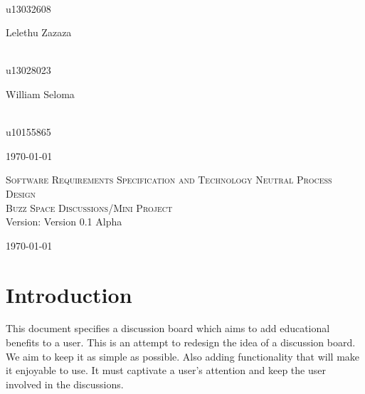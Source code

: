 \documentclass[a4paper,12pt]{report}
\begin{document}
\begin{titlepage}
\begin{center}
\begin{minipage}{0.4\textwidth}
\end{minipage}
\begin{minipage}{0.4\textwidth}
\begin{flushright} \large
\emph{} \\
u13032608
\end{flushright}
\end{minipage}
\begin{minipage}{0.4\textwidth}
\begin{flushleft} \large
Lelethu {Zazaza}
\end{flushleft}
\end{minipage}
\begin{minipage}{0.4\textwidth}
\begin{flushright} \large
\emph{} \\
u13028023
\end{flushright}
\end{minipage}
\begin{minipage}{0.4\textwidth}
\begin{flushleft} \large
William {Seloma}
\end{flushleft}
\end{minipage}
\begin{minipage}{0.4\textwidth}
\begin{flushright} \large
\emph{} \\
u10155865
\end{flushright}
\end{minipage}

\vfill
{\large \today}
\end{center}
\end{titlepage}
\footnotesize

\normalsize

\renewcommand{\thesection}{\arabic{section}}
\newpage
\begin{center}
\textsc{\LARGE Software Requirements Specification and Technology Neutral Process Design}\\[1.5cm]
\textsc{\Large Buzz Space Discussions/Mini Project}\\[0.5cm]
Version: Version 0.1 Alpha 

\today
\end{center}
\tableofcontents{}
\section{Introduction}
This document specifies a discussion board which aims to add educational benefits to a user. This is an attempt to redesign the idea of a discussion board. We aim to keep it as simple as possible. Also adding functionality that will make it enjoyable to use. It must captivate a user's attention and keep the user involved in the discussions. 
\end{document}
